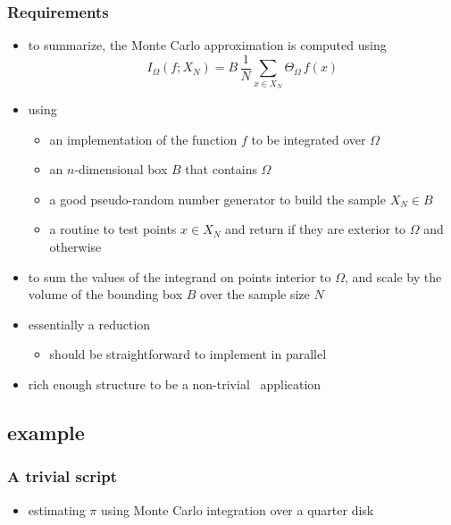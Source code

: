 \begin{frame}
%
  \frametitle{Requirements}
%
  \begin{itemize}
%
  \item to summarize, the Monte Carlo approximation is computed using
%
    \begin{equation}
      I_{\Omega} (f; X_{N})
      =
      B \, \frac{1}{N} \sum_{x \in X_{N}} \Theta_{\Omega} \, f(x)
    \end{equation}
%
  \item using
    \begin{itemize}
    \item an implementation of the function $f$ to be integrated over $\Omega$
    \item an $n$-dimensional box $B$ that contains $\Omega$
    \item a good pseudo-random number generator to build the sample $X_{N} \in B$
    \item a routine to test points $x \in X_{N}$ and return  if they are
      exterior to $\Omega$ and  otherwise
    \end{itemize}
%
  \item to sum the values of the integrand on points interior to $\Omega$, and scale by the
    volume of the bounding box $B$ over the sample size $N$
%
  \item essentially a reduction
    \begin{itemize}
    \item should be straightforward to implement in parallel
    \end{itemize}
%
  \item rich enough structure to be a non-trivial \pyre\ application
%
  \end{itemize}
%
\end{frame}


\subsection{example}

\begin{frame}
%
  \frametitle{A trivial script}
%
  \begin{itemize}
  \item estimating $\pi$ using Monte Carlo integration over a quarter disk
  \end{itemize}
%

%
\end{frame}

